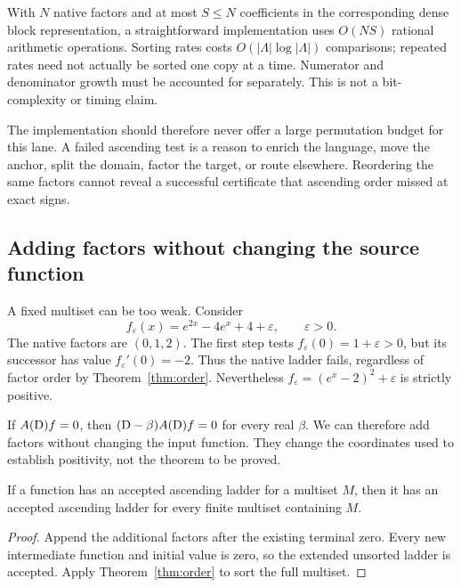 With $N$ native factors and at most $S\le N$ coefficients in the corresponding
dense block representation, a straightforward implementation uses $O(NS)$
rational arithmetic operations. Sorting rates costs $O(|\Lambda|\log|\Lambda|)$
comparisons; repeated rates need not actually be sorted one copy at a time.
Numerator and denominator growth must be accounted for separately. This is
not a bit-complexity or timing claim.

The implementation should therefore never offer a large permutation budget for
this lane. A failed ascending test is a reason to enrich the language, move the
anchor, split the domain, factor the target, or route elsewhere. Reordering the
same factors cannot reveal a successful certificate that ascending order missed
at exact signs.

\subsection{Adding factors without changing the source function}

A fixed multiset can be too weak. Consider
\begin{equation}
 f_\varepsilon(x)=e^{2x}-4e^x+4+\varepsilon,
 \qquad \varepsilon>0.
 \label{eq:epsilon-family}
\end{equation}
The native factors are $(0,1,2)$. The first step tests $f_\varepsilon(0)=1+\varepsilon>0$,
but its successor has value $f_\varepsilon'(0)=-2$. Thus the native ladder
fails, regardless of factor order by Theorem~\ref{thm:order}. Nevertheless
$f_\varepsilon=(e^x-2)^2+\varepsilon$ is strictly positive.

If $A(\mathrm D)f=0$, then $(\mathrm D-\beta)A(\mathrm D)f=0$ for every real $\beta$.
We can therefore add factors without changing the input function. They change
the coordinates used to establish positivity, not the theorem to be proved.

\begin{proposition}
\label{prop:extension}
If a function has an accepted ascending ladder for a multiset $M$, then it has
an accepted ascending ladder for every finite multiset containing $M$.
\end{proposition}
\begin{proof}
Append the additional factors after the existing terminal zero. Every new
intermediate function and initial value is zero, so the extended unsorted
ladder is accepted. Apply Theorem~\ref{thm:order} to sort the full multiset.
\end{proof}

